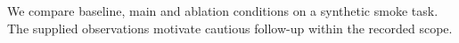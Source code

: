 We compare baseline, main and ablation conditions on a synthetic smoke task. The supplied observations motivate cautious follow-up within the recorded scope.
